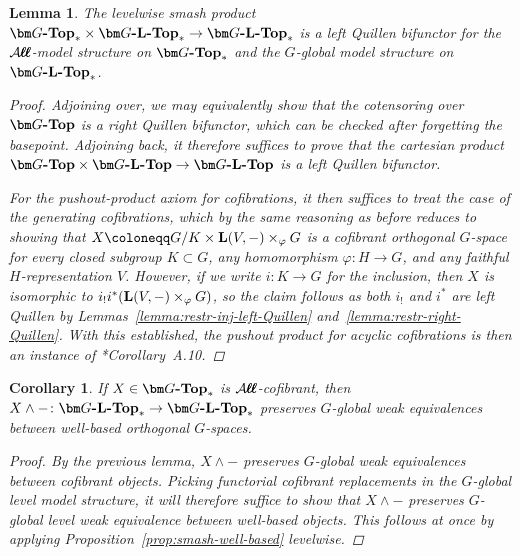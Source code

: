 \documentclass[reqno]{memo-l}
\theoremstyle{mythm}
\newtheorem{lemma}[thm]{Lemma}
\newtheorem{cor}[thm]{Corollary}
\theoremstyle{definition}
\numberwithin{equation}{section}
\newcommand{\Aa}{{\mathcal{A}}}
\renewcommand{\phi}{\varphi}
\newcommand{\cat}[1]{\textbf{\textup{#1}}}
\newcommand{\bigAll}{\hbox{\hfuzz=20pt\hbox{$\mathcal A\kern-.3pt$}\setbox0=\hbox{$\ell\kern-.75pt\ell$}\hbox to 0pt{\hfuzz=8pt\kern-.075pt\unhcopy0}\hbox to 0pt{\hfuzz=8pt\kern.075pt\unhcopy0}\box0\kern.05pt}}
\newcommand{\smallAll}{\Aa\kern-.3pt\ell\kern-.6pt\ell}
\newcommand{\All}{\mathchoice{\bigAll}{\bigAll}{\smallAll}{\smallAll}}
\let\smashp=\wedge
\begin{document}
\begin{lemma}\label{lemma:G-Top*-tensored}
    The levelwise smash product $\cat{$\bm G$-Top}_*\times\cat{$\bm G$-$\cat{L}$-Top}_*\to \cat{$\bm G$-$\cat{L}$-Top}_*$ is a left Quillen bifunctor for the $\All$-model structure on $\cat{$\bm G$-Top}_*$ and the $G$-global model structure on $\cat{$\bm G$-$\cat{L}$-Top}_*$.
    \begin{proof}
        Adjoining over, we may equivalently show that the cotensoring over $\cat{$\bm G$-Top}$ is a right Quillen bifunctor, which can be checked after forgetting the basepoint. Adjoining back, it therefore suffices to prove that the cartesian product $\cat{$\bm G$-Top}\times\cat{$\bm G$-$\cat{L}$-Top}\to \cat{$\bm G$-$\cat{L}$-Top}$ is a left Quillen bifunctor. 
        
        For the pushout-product axiom for cofibrations, it then suffices to treat the case of the generating cofibrations, which by the same reasoning as before reduces to showing that $X\coloneqq G/K\times\cat{L}(V,-)\times_\phi G$ is a cofibrant orthogonal $G$-space for every closed subgroup $K\subset G$, any homomorphism $\phi\colon H\to G$, and any faithful $H$-representation $V$. However, if we write $i\colon K\to G$ for the inclusion, then $X$ is isomorphic to $i_!i^*(\cat{L}(V,-)\times_\phi G)$, so the claim follows as both $i_!$ and $i^*$ are left Quillen by Lemmas~\ref{lemma:restr-inj-left-Quillen} and~\ref{lemma:restr-right-Quillen}. With this established, the pushout product for acyclic cofibrations is then an instance of \cite{barrero2021}*{Corollary~A.10}.
    \end{proof}
\end{lemma}

\begin{cor}\label{cor:global-smash-well-based}
    If $X\in\cat{$\bm G$-Top}_*$ is $\All$-cofibrant, then $X\smashp{-}\colon\cat{$\bm G$-$\cat{L}$-Top}_*\to \cat{$\bm G$-$\cat{L}$-Top}_*$ preserves $G$-global weak equivalences between well-based orthogonal $G$-spaces.
    \begin{proof}
        By the previous lemma, $X\smashp{-}$ preserves $G$-global weak equivalences between \emph{cofibrant} objects. Picking functorial cofibrant replacements in the $G$-global level model structure, it will therefore suffice to show that $X\smashp{-}$ preserves $G$-global \emph{level} weak equivalence between well-based objects. This follows at once by applying Proposition~\ref{prop:smash-well-based} levelwise.
    \end{proof}
\end{cor}
\end{document}
